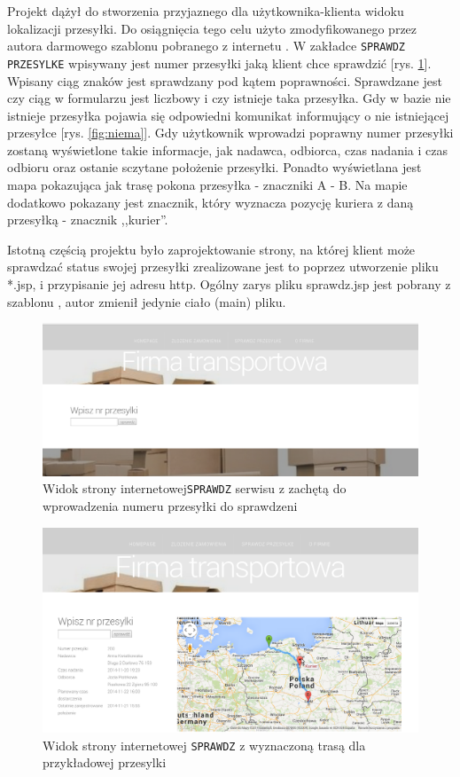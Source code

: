 \documentclass[eng,printmode,oneside]{mgr}
\begin{document}
Projekt dążył do stworzenia przyjaznego dla użytkownika-klienta widoku
lokalizacji przesyłki. Do osiągnięcia tego celu użyto zmodyfikowanego przez
autora darmowego szablonu pobranego z internetu \cite{szablon}. W zakładce
\texttt{SPRAWDZ PRZESYLKE} wpisywany jest numer przesyłki jaką klient chce
sprawdzić [rys.
\ref{fig:sprawdz}]. Wpisany ciąg znaków jest sprawdzany pod kątem poprawności.
Sprawdzane jest czy ciąg w formularzu jest liczbowy i czy istnieje taka
przesyłka. Gdy w bazie nie istnieje przesyłka pojawia się odpowiedni komunikat
informujący o nie istniejącej przesyłce [rys. \ref{fig:niema}]. Gdy użytkownik
wprowadzi poprawny numer przesyłki zostaną wyświetlone takie informacje, jak
nadawca, odbiorca, czas nadania i czas odbioru oraz ostanie sczytane położenie
przesyłki. Ponadto wyświetlana jest mapa pokazująca jak trasę pokona przesyłka -
znaczniki A - B. Na mapie dodatkowo pokazany jest znacznik, który wyznacza
pozycję kuriera z daną przesyłką - znacznik ,,kurier''.

Istotną częścią projektu było zaprojektowanie strony, na której
klient może sprawdzać status swojej przesyłki zrealizowane jest to poprzez utworzenie pliku
*.jsp, i przypisanie jej adresu http. Ogólny zarys pliku sprawdz.jsp jest
pobrany z szablonu \cite{szablon}, autor zmienił jedynie ciało (main) pliku. 

\begin{figure}[ht!]
\centering
\includegraphics[width=\textwidth]{sprawdz.png}
\caption{Widok strony internetowej\texttt{SPRAWDZ} serwisu z zachętą do
wprowadzenia numeru przesyłki do sprawdzeni}
\label{fig:sprawdz}
\end{figure}

\begin{figure}[ht!]
\centering
\includegraphics[width=\textwidth]{przyklad.png}
\caption{Widok strony internetowej \texttt{SPRAWDZ} z wyznaczoną trasą dla
przykładowej przesylki}
\label{fig:pokaz}
\end{figure}
\end{document}
